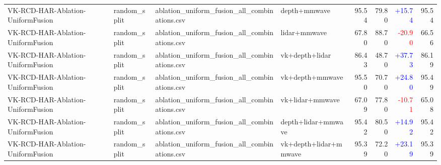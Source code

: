 \documentclass[10pt]{article}
\begin{document}
\begin{longtable}{llllrrrr}
VK-RCD-HAR-Ablation-UniformFusion & random\_split & ablation\_uniform\_fusion\_all\_combinations.csv & depth+mmwave & 95.54 & 79.80 & \textcolor{blue}{+15.74} & 95.54\\
VK-RCD-HAR-Ablation-UniformFusion & random\_split & ablation\_uniform\_fusion\_all\_combinations.csv & lidar+mmwave & 67.80 & 88.70 & \textcolor{red}{-20.90} & 66.56\\
VK-RCD-HAR-Ablation-UniformFusion & random\_split & ablation\_uniform\_fusion\_all\_combinations.csv & vk+depth+lidar & 86.43 & 48.70 & \textcolor{blue}{+37.73} & 86.19\\
VK-RCD-HAR-Ablation-UniformFusion & random\_split & ablation\_uniform\_fusion\_all\_combinations.csv & vk+depth+mmwave & 95.50 & 70.70 & \textcolor{blue}{+24.80} & 95.49\\
VK-RCD-HAR-Ablation-UniformFusion & random\_split & ablation\_uniform\_fusion\_all\_combinations.csv & vk+lidar+mmwave & 67.09 & 77.80 & \textcolor{red}{-10.71} & 65.08\\
VK-RCD-HAR-Ablation-UniformFusion & random\_split & ablation\_uniform\_fusion\_all\_combinations.csv & depth+lidar+mmwave & 95.42 & 80.50 & \textcolor{blue}{+14.92} & 95.42\\
VK-RCD-HAR-Ablation-UniformFusion & random\_split & ablation\_uniform\_fusion\_all\_combinations.csv & vk+depth+lidar+mmwave & 95.39 & 72.20 & \textcolor{blue}{+23.19} & 95.39\\
\bottomrule
\end{longtable}
\normalsize
\end{document}
